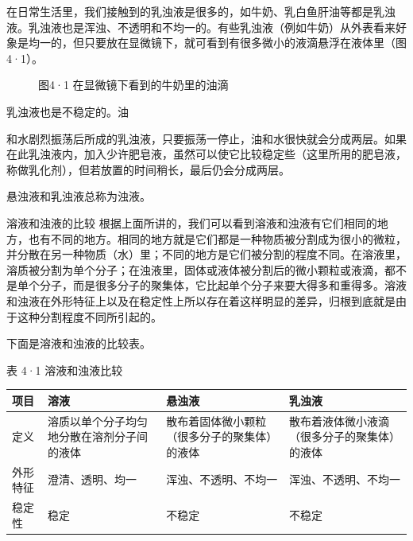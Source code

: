 在日常生活里，我们接触到的乳浊液是很多的，如牛奶、乳白鱼肝油等都是乳浊液。乳浊液也是浑浊、不透明和不均一的。有些乳浊液（例如牛奶）从外表看来好象是均一的，但只要放在显微镜下，就可看到有很多微小的液滴悬浮在液体里（图4·1）。

\begin{figure}
\centering
\caption{图4·1 在显微镜下看到的牛奶里的油滴}
\end{figure}

乳浊液也是不稳定的。油

和水剧烈振荡后所成的乳浊液，只要振荡一停止，油和水很快就会分成两层。如果在此乳浊液内，加入少许肥皂液，虽然可以使它比较稳定些（这里所用的肥皂液，称做乳化剂），但若放置的时间稍长，最后仍会分成两层。

悬浊液和乳浊液总称为浊液。

溶液和浊液的比较
根据上面所讲的，我们可以看到溶液和浊液有它们相同的地方，也有不同的地方。相同的地方就是它们都是一种物质被分割成为很小的微粒，并分散在另一种物质（水）里；不同的地方是它们被分割的程度不同。在溶液里，溶质被分割为单个分子；在浊液里，固体或液体被分割后的微小颗粒或液滴，都不是单个分子，而是很多分子的聚集体，它比起单个分子来要大得多和重得多。溶液和浊液在外形特征上以及在稳定性上所以存在着这样明显的差异，归根到底就是由于这种分割程度不同所引起的。

下面是溶液和浊液的比较表。

表 4·1 溶液和浊液比较

{\def\LTcaptype{none} %
\begin{longtable}[]{@{}
  >{\raggedright\arraybackslash}p{}
  >{\raggedright\arraybackslash}p{}
  >{\raggedright\arraybackslash}p{}
  >{\raggedright\arraybackslash}p{}@{}}
\toprule\noalign{}
\begin{minipage}[b]{\linewidth}\raggedright
项目
\end{minipage} & \begin{minipage}[b]{\linewidth}\raggedright
溶液
\end{minipage} & \begin{minipage}[b]{\linewidth}\raggedright
悬浊液
\end{minipage} & \begin{minipage}[b]{\linewidth}\raggedright
乳浊液
\end{minipage} \\
\midrule\noalign{}
\endhead
\bottomrule\noalign{}
\endlastfoot
定义 & 溶质以单个分子均匀地分散在溶剂分子间的液体 &
散布着固体微小颗粒（很多分子的聚集体）的液体 &
散布着液体微小液滴（很多分子的聚集体）的液体 \\
外形特征 & 澄清、透明、均一 & 浑浊、不透明、不均一 &
浑浊、不透明、不均一 \\
稳定性 & 稳定 & 不稳定 & 不稳定 \\
\end{longtable}
}

